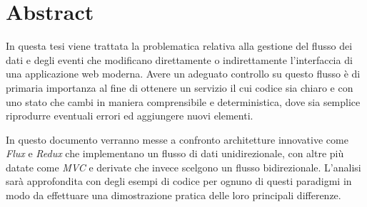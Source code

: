 \chapter*{Abstract}

In questa tesi viene trattata la problematica relativa alla gestione del flusso dei dati e degli eventi che modificano direttamente o indirettamente l'interfaccia di una applicazione web moderna. Avere un adeguato controllo su questo flusso è di primaria importanza al fine di ottenere un servizio il cui codice sia chiaro e con uno stato che cambi in maniera comprensibile e deterministica, dove sia semplice riprodurre eventuali errori ed aggiungere nuovi elementi.

In questo documento verranno messe a confronto architetture innovative come \textit{Flux} e \textit{Redux} che implementano un flusso di dati unidirezionale, con altre più datate come \textit{MVC} e derivate che invece scelgono un flusso bidirezionale. 
L'analisi sarà approfondita con degli esempi di codice per ognuno di questi paradigmi in modo da effettuare una dimostrazione pratica delle loro principali differenze.